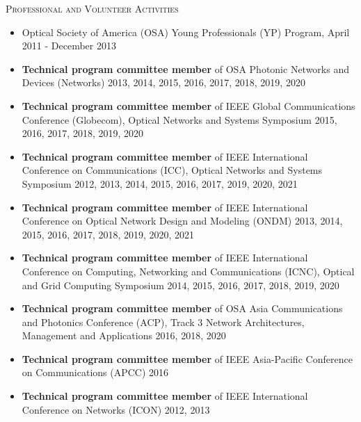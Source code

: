 \documentclass[letterpaper,11pt]{article}
\newcommand{\resheading}[1]{{\noindent\large \colorbox{mygrey}{
\begin{minipage}{1.0\textwidth}{\textsc{#1 \vphantom{p\^{E}}}}\end{minipage}}}}
\begin{document}
\leftskip 0.0cm
\vspace{0.1in}
\resheading{Professional and Volunteer Activities}%
\begin{itemize}
\setlength{\itemindent}{-0.075in}


\item
Optical Society of America (OSA) Young Professionals (YP) Program, April 2011 - December 2013

\item
\textbf{Technical program committee member} of OSA Photonic Networks and Devices (Networks) 2013, 2014, 2015, 2016, 2017, 2018, 2019, 2020

\item
\textbf{Technical program committee member} of IEEE Global Communications Conference (Globecom), Optical Networks and Systems Symposium 2015, 2016, 2017,
2018, 2019, 2020

\item
\textbf{Technical program committee member} of IEEE International Conference on Communications (ICC), Optical Networks and Systems Symposium
2012, 2013, 2014, 2015, 2016, 2017, 2019, 2020, 2021

\item
\textbf{Technical program committee member} of IEEE International Conference on Optical Network Design and Modeling (ONDM)
2013, 2014, 2015, 2016, 2017, 2018, 2019, 2020, 2021

\item
\textbf{Technical program committee member} of IEEE International Conference on Computing, Networking and Communications (ICNC),
Optical and Grid Computing Symposium 2014, 2015, 2016, 2017, 2018, 2019, 2020

\item
\textbf{Technical program committee member} of OSA Asia Communications and Photonics Conference (ACP),
Track 3 Network Architectures, Management and Applications 2016, 2018, 2020

\item
\textbf{Technical program committee member} of IEEE Asia-Pacific Conference on Communications (APCC) 2016

\item
\textbf{Technical program committee member} of IEEE International Conference on Networks (ICON) 2012, 2013


\end{itemize}
\end{document}
